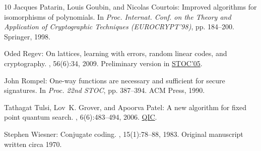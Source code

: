 \begin{thebibliography}{10}
{\sc Jacques Patarin, Louis Goubin, and Nicolas Courtois}: Improved algorithms
  for isomorphisms of polynomials.
\newblock In {\em Proc. Internat. Conf. on the Theory and Application of
  Cryptographic Techniques (EUROCRYPT'98)}, pp. 184--200. Springer, 1998.

{\sc Oded Regev}: On lattices, learning with errors, random linear codes, and
  cryptography.
, 56(6):34, 2009.
\newblock Preliminary version in
  \href{http://dx.doi.org/10.1145/1060590.1060603}{STOC'05}.
\newblock [\epfmtdoi{10.1145/1568318.1568324}]

{\sc John Rompel}: One-way functions are necessary and sufficient for secure
  signatures.
\newblock In {\em Proc. 22nd STOC}, pp. 387--394. ACM Press, 1990.
\newblock [\epfmtdoi{10.1145/100216.100269}]

{\sc Tathagat Tulsi, Lov~K. Grover, and Apoorva Patel}: A new algorithm for
  fixed point quantum search.
, 6(6):483--494, 2006.
\newblock \href{http://www.rintonpress.com/journals/qiconline.html\#v6n6}{QIC}.

{\sc Stephen Wiesner}: Conjugate coding.
, 15(1):78--88, 1983.
\newblock Original manuscript written circa 1970.
\newblock [\epfmtdoi{10.1145/1008908.1008920}]

\end{thebibliography}
